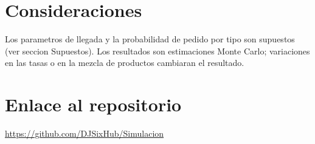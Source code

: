 \documentclass[11pt]{article}
\begin{document}
\section*{Consideraciones}
Los parametros de llegada y la probabilidad de pedido por tipo son supuestos (ver seccion Supuestos). Los resultados son estimaciones Monte Carlo; variaciones en las tasas o en la mezcla de productos cambiaran el resultado.

\section*{Enlace al repositorio}
\url{https://github.com/DJSixHub/Simulacion}
\end{document}
